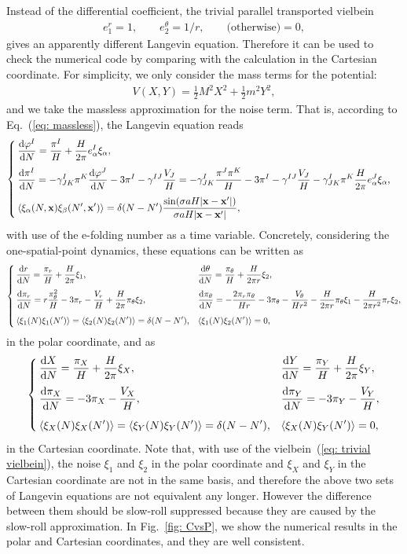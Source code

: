 \documentclass[aps, prd
, preprint
, nofootinbib 
]{revtex4-1}
\newcommand{\dif}[2]{\frac{\mathrm{d} #1}{\mathrm{d} #2}}
\newcommand{\bae}[1]{\begin{align} #1 \end{align}}
\newcommand{\bce}[1]{\begin{cases} #1 \end{cases}}
\begin{document}
\bigskip
Instead of the differential coefficient, the trivial parallel transported vielbein
\bae{\label{eq: trivial vielbein}
	e^r_1=1, \quad\quad e^\theta_2=1/r, \quad\quad \text{(otherwise)}=0,
}
gives an apparently different Langevin equation. Therefore it can be used to check the numerical code by comparing
with the calculation in the Cartesian coordinate.
For simplicity, we only consider the mass terms for the potential:
\bae{
	V(X,Y)=\frac{1}{2}M^2X^2+\frac{1}{2}m^2Y^2,
}
and we take the massless approximation for the noise term. That is, according to Eq.~(\ref{eq: massless}), 
the Langevin equation reads
\bae{
	\bce{
		\displaystyle
		\dif{\varphi^I}{N}=\frac{\pi^I}{H}+\frac{H}{2\pi}e^I_\alpha\xi_\alpha, \\[10pt]
		\displaystyle
		\dif{\pi^I}{N}=-\gamma^I_{JK}\pi^K\dif{\varphi^J}{N}-3\pi^I-\gamma^{IJ}\frac{V_J}{H}
		=-\gamma^I_{JK}\frac{\pi^J\pi^K}{H}-3\pi^I-\gamma^{IJ}\frac{V_J}{H}-\gamma^I_{JK}\pi^K\frac{H}{2\pi}e^J_\alpha\xi_\alpha, \\[10pt]
		\displaystyle
		\braket{\xi_\alpha(N,\mathbf{x})\xi_\beta(N^\prime,\mathbf{x}^\prime)}=\delta(N-N^\prime)
		\frac{\sin(\sigma aH|\mathbf{x}-\mathbf{x}^\prime|)}{\sigma aH|\mathbf{x}-\mathbf{x}^\prime|},
	}
}
with use of the e-folding number as a time variable. Concretely, considering the one-spatial-point dynamics,
these equations can be written as
\bae{
	\bce{
		\displaystyle
		\dif{r}{N}=\frac{\pi_r}{H}+\frac{H}{2\pi}\xi_1, & 
		\displaystyle
		\dif{\theta}{N}=\frac{\pi_\theta}{H}+\frac{H}{2\pi r}\xi_2, \\[10pt]
		\displaystyle
		\dif{\pi_r}{N}=r\frac{\pi_\theta^2}{H}-3\pi_r-\frac{V_r}{H}+\frac{H}{2\pi}\pi_\theta\xi_2, &
		\displaystyle
		\dif{\pi_\theta}{N}=-\frac{2\pi_r\pi_\theta}{Hr}-3\pi_\theta-\frac{V_\theta}{Hr^2}-\frac{H}{2\pi r}\pi_\theta\xi_1-\frac{H}{2\pi r^2}\pi_r\xi_2, \\[10pt]
		\displaystyle
		\braket{\xi_1(N)\xi_1(N^\prime)}=\braket{\xi_2(N)\xi_2(N^\prime)}=\delta(N-N^\prime), &
		\displaystyle
		\braket{\xi_1(N)\xi_2(N^\prime)}=0,
	}
}
in the polar coordinate, and as
\bae{
	\bce{
		\displaystyle
		\dif{X}{N}=\frac{\pi_X}{H}+\frac{H}{2\pi}\xi_X, &
		\displaystyle
		\dif{Y}{N}=\frac{\pi_Y}{H}+\frac{H}{2\pi}\xi_Y, \\[10pt]
		\displaystyle
		\dif{\pi_X}{N}=-3\pi_X-\frac{V_X}{H}, &
		\displaystyle
		\dif{\pi_Y}{N}=-3\pi_Y-\frac{V_Y}{H}, \\[10pt]
		\displaystyle
		\braket{\xi_X(N)\xi_X(N^\prime)}=\braket{\xi_Y(N)\xi_Y(N^\prime)}=\delta(N-N^\prime), &
		\displaystyle
		\braket{\xi_X(N)\xi_Y(N^\prime)}=0,
	}
}
in the Cartesian coordinate.
Note that, with use of the vielbein~(\ref{eq: trivial vielbein}), the noise $\xi_1$ and $\xi_2$ in the polar coordinate and
$\xi_X$ and $\xi_Y$ in the Cartesian coordinate are not in the same basis, and therefore the above two sets of Langevin equations are
not equivalent any longer. However the difference between them should be slow-roll suppressed because they are caused by 
the slow-roll approximation.
In Fig.~\ref{fig: CvsP}, we show the numerical results in the polar and Cartesian coordinates, and they are well consistent. 
\end{document}
